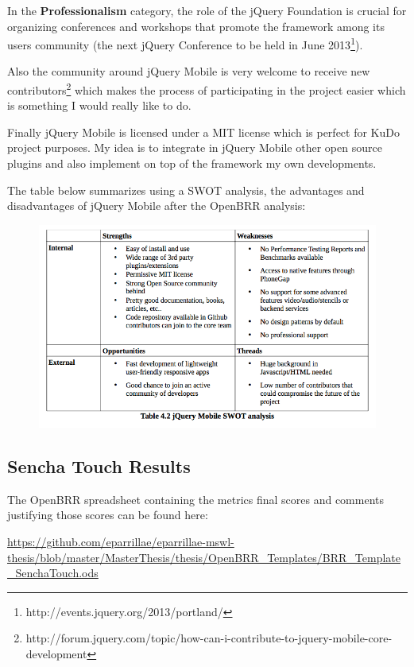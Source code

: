\documentclass[a4paper,12pt]{book}
\begin{document}
In the \textbf{Professionalism} category, the role of the jQuery Foundation is crucial for organizing conferences and workshops that promote the framework among its users community (the next jQuery Conference to be held in June 2013\footnote{http://events.jquery.org/2013/portland/}).

Also the community around jQuery Mobile is very welcome to receive new contributors\footnote{http://forum.jquery.com/topic/how-can-i-contribute-to-jquery-mobile-core-development} which makes the process of participating in the project easier which is something I would really like to do.

Finally jQuery Mobile is licensed under a MIT license which is perfect for KuDo project purposes. My idea is to integrate in jQuery Mobile other open source plugins and also implement on top of the framework my own developments.

The table below summarizes using a SWOT analysis, the advantages and disadvantages of jQuery Mobile after the OpenBRR analysis:

\begin{figure}[H]
    \centering
    \includegraphics[width=12cm, keepaspectratio]{img/table42.png}
 \end{figure}

\subsection{Sencha Touch Results}
\label{Sencha Touch Results}

The OpenBRR spreadsheet containing the metrics final scores and comments justifying those scores can be found here:

\url{
https://github.com/eparrillae/eparrillae-mswl-thesis/blob/master/MasterThesis/thesis/OpenBRR_Templates/BRR_Template_SenchaTouch.ods}
\end{document}
